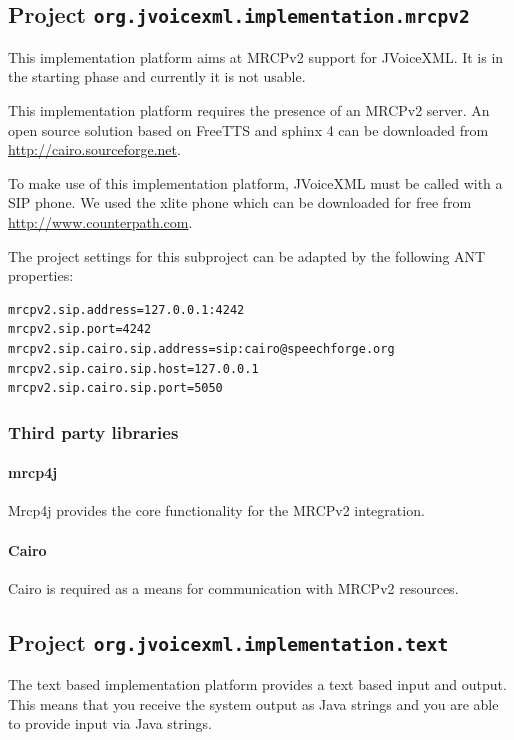 \documentclass[11pt,a4paper]{article}
\begin{document}
\subsection{Project \texttt{org.jvoicexml.implementation.mrcpv2}}

This implementation platform aims at MRCPv2 support for JVoiceXML. It is in the
starting phase and currently it is not usable.

This implementation platform requires the presence of an MRCPv2 server. An open
source solution based on FreeTTS and sphinx 4 can be downloaded from
\url{http://cairo.sourceforge.net}.

To make use of this implementation platform, JVoiceXML must be called with a SIP
phone. We used the xlite phone which can be downloaded for free from
\url{http://www.counterpath.com}.

The project settings for this subproject can be adapted by the following ANT
properties:
\begin{lstlisting}
mrcpv2.sip.address=127.0.0.1:4242
mrcpv2.sip.port=4242
mrcpv2.sip.cairo.sip.address=sip:cairo@speechforge.org
mrcpv2.sip.cairo.sip.host=127.0.0.1
mrcpv2.sip.cairo.sip.port=5050
\end{lstlisting}

\subsubsection{Third party libraries}
\label{sec:mrcpv2-third-party-libr}

\paragraph{mrcp4j}

Mrcp4j provides the core functionality for the MRCPv2 integration.

\paragraph{Cairo}

Cairo is required as a means for communication with MRCPv2 resources.

\subsection{Project \texttt{org.jvoicexml.implementation.text}}

The text based implementation platform provides a text based input and output.
This means that you receive the system output as Java strings and you are able
to provide input via Java strings.
\end{document}
